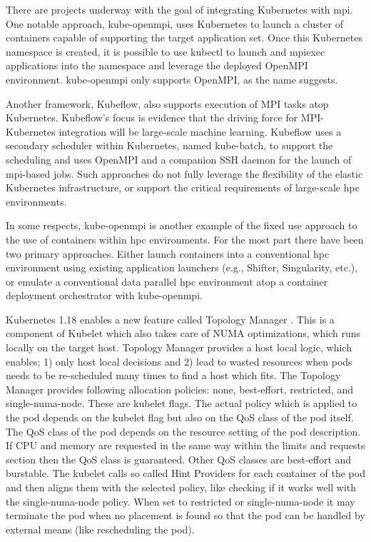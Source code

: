 \documentclass[conference]{IEEEtran}
\begin{document}
There are projects underway with the goal of integrating Kubernetes with \gls{mpi}. One notable approach, kube-openmpi, uses Kubernetes to launch a cluster of containers capable of supporting the target application set. Once this Kubernetes namespace is created, it is possible to use kubectl to launch and mpiexec applications into the namespace and leverage the deployed OpenMPI environment. kube-openmpi only supports OpenMPI, as the name suggests.

Another framework, Kubeflow, also supports execution of MPI tasks atop Kubernetes. Kubeflow’s focus is evidence that the driving force for MPI-Kubernetes integration will be large-scale machine learning. Kubeflow uses a secondary scheduler within Kubernetes, named kube-batch, to support the scheduling and uses OpenMPI and a companion SSH daemon for the launch of \gls{mpi}-based jobs. Such approaches do not fully leverage the flexibility of the elastic Kubernetes infrastructure, or support the critical requirements of large-scale \gls{hpc} environments.

In some respects, kube-openmpi is another example of the fixed use approach to the use of containers within \gls{hpc} environments. For the most part there have been two primary approaches. Either launch containers into a conventional \gls{hpc} environment using existing application launchers (e.g., Shifter, Singularity, etc.), or emulate a conventional data parallel \gls{hpc} environment atop a container deployment orchestrator with kube-openmpi.

Kubernetes 1.18 enables a new feature called Topology Manager \cite{gridengine-topology}. This is a component of Kubelet which also takes care of NUMA optimizations, which runs locally on the target host. Topology Manager provides a host local logic, which enables; 1) only host local decisions and 2) lead to wasted resources when pods needs to be re-scheduled many times to find a host which fits. The Topology Manager provides following allocation policies: none, best-effort, restricted, and single-numa-node. These are kubelet flags. The actual policy which is applied to the pod depends on the kubelet flag but also on the QoS class of the pod itself. The QoS class of the pod depends on the resource setting of the pod description. If CPU and memory are requested in the same way within the limits and requests section then the QoS class is guaranteed. Other QoS classes are best-effort and burstable. The kubelet calls so called Hint Providers for each container of the pod and then aligns them with the selected policy, like checking if it works well with the single-numa-node policy. When set to restricted or single-numa-node it may terminate the pod when no placement is found so that the pod can be handled by external means (like rescheduling the pod).
\end{document}
